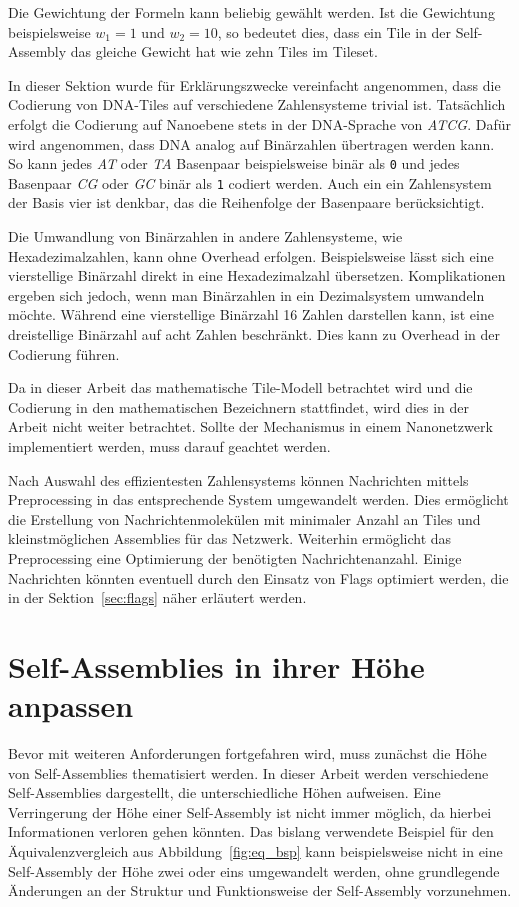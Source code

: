 Die Gewichtung der Formeln kann beliebig gewählt werden. Ist die Gewichtung beispielsweise $w_1 = 1$ und $w_2 = 10$, so bedeutet dies, dass ein Tile in der Self-Assembly das gleiche Gewicht hat wie zehn Tiles im Tileset.

In dieser Sektion wurde für Erklärungszwecke vereinfacht angenommen, dass die Codierung von DNA-Tiles auf verschiedene Zahlensysteme trivial ist. Tatsächlich erfolgt die Codierung auf Nanoebene stets in der DNA-Sprache von \emph{ATCG}. Dafür wird angenommen, dass DNA analog auf Binärzahlen übertragen werden kann. So kann jedes \emph{AT} oder \emph{TA} Basenpaar beispielsweise binär als \texttt{0} und jedes Basenpaar \emph{CG} oder \emph{GC} binär als \texttt{1} codiert werden. Auch ein ein Zahlensystem der Basis vier ist denkbar, das die Reihenfolge der Basenpaare berücksichtigt.

Die Umwandlung von Binärzahlen in andere Zahlensysteme, wie Hexadezimalzahlen, kann ohne Overhead erfolgen. Beispielsweise lässt sich eine vierstellige Binärzahl direkt in eine Hexadezimalzahl übersetzen. Komplikationen ergeben sich jedoch, wenn man Binärzahlen in ein Dezimalsystem umwandeln möchte. Während eine vierstellige Binärzahl 16 Zahlen darstellen kann, ist eine dreistellige Binärzahl auf acht Zahlen beschränkt. Dies kann zu Overhead in der Codierung führen.

Da in dieser Arbeit das mathematische Tile-Modell betrachtet wird und die Codierung in den mathematischen Bezeichnern stattfindet, wird dies in der Arbeit nicht weiter betrachtet. Sollte der Mechanismus in einem Nanonetzwerk implementiert werden, muss darauf geachtet werden.  

Nach Auswahl des effizientesten Zahlensystems können Nachrichten mittels Preprocessing in das entsprechende System umgewandelt werden. Dies ermöglicht die Erstellung von Nachrichtenmolekülen mit minimaler Anzahl an Tiles und kleinstmöglichen Assemblies für das Netzwerk. Weiterhin ermöglicht das Preprocessing eine Optimierung der benötigten Nachrichtenanzahl. Einige Nachrichten könnten eventuell durch den Einsatz von Flags optimiert werden, die in der Sektion~\ref{sec:flags} näher erläutert werden.

\section{Self-Assemblies in ihrer Höhe anpassen}

Bevor mit weiteren Anforderungen fortgefahren wird, muss zunächst die Höhe von Self-Assemblies thematisiert werden. In dieser Arbeit werden verschiedene Self-Assemblies dargestellt, die unterschiedliche Höhen aufweisen. Eine Verringerung der Höhe einer Self-Assembly ist nicht immer möglich, da hierbei Informationen verloren gehen könnten. Das bislang verwendete Beispiel für den Äquivalenzvergleich aus Abbildung~\ref{fig:eq_bsp} kann beispielsweise nicht in eine Self-Assembly der Höhe zwei oder eins umgewandelt werden, ohne grundlegende Änderungen an der Struktur und Funktionsweise der Self-Assembly vorzunehmen.

